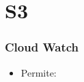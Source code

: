 \section{S3}

\begin{frame}
	\frametitle{Cloud Watch}
	\begin{itemize}
		\item Permite:
	\end{itemize}
\end{frame}

